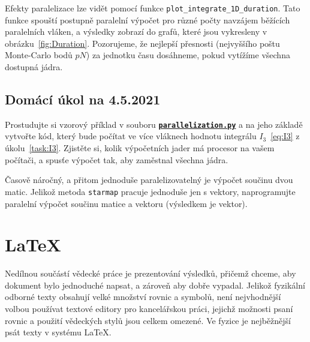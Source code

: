 \documentclass[a4paper,11pt,twoside]{article}
\def\code#1{\textnormal{\texttt{#1}}}
\def\ghfile#1#2{\textnormal{\textbf{\texttt{\href{https://github.com/PavelStransky/PCInPhysics/blob/main/#1#2}{#2}}}}}
\theoremstyle{red}
\theoremstyle{green}
\begin{document}
    Efekty paralelizace lze vidět pomocí funkce \code{plot_integrate_1D_duration}.
    Tato funkce spouští postupně paralelní výpočet pro různé počty navzájem běžících paralelních vláken,
    a výsledky zobrazí do grafů, které jsou vykresleny v obrázku~\ref{fig:Duration}.  
    Pozorujeme, že nejlepší přesnosti (nejvyššího poštu Monte-Carlo bodů $pN$) za jednotku času dosáhneme, pokud vytížíme všechna dostupná jádra. 

    \newpage
    \subsection{Domácí úkol na 4.5.2021}
    \begin{task}
        Prostudujte si vzorový příklad v souboru \ghfile{python/montecarlo/}{parallelization.py} a na jeho základě vytvořte kód, který bude počítat ve více vláknech hodnotu integrálu $I_{3}$~\eqref{eq:I3} z úkolu~\ref{task:I3}.
        Zjistěte si, kolik výpočetních jader má procesor na vašem počítači, a spusťe výpočet tak, aby zaměstnal všechna jádra.
    \end{task}

    \begin{task}
        Časově náročný, a přitom jednoduše paralelizovatelný je výpočet součinu dvou matic.
        Jelikož metoda \code{starmap} pracuje jednoduše jen s vektory, naprogramujte paralelní výpočet součinu matice a vektoru (výsledkem je vektor).
    \end{task}

    \section{LaTeX}
    Nedílnou součástí vědecké práce je prezentování výsledků, přičemž chceme, aby dokument bylo jednoduché napsat, a zároveň aby dobře vypadal.
    Jelikož fyzikální odborné texty obsahují velké množství rovnic a symbolů, není nejvhodnější volbou používat textové editory pro kancelářskou práci, jejichž možnosti psaní rovnic a použití vědeckých stylů jsou celkem omezené.
    Ve fyzice je nejběžnější psát texty v systému \LaTeX. 
    
\end{document}
